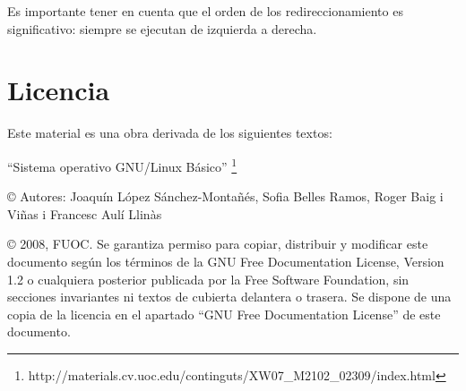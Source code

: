 \documentclass[12pt]{article}
\begin{document}
Es importante tener en cuenta que el orden de los redireccionamiento es 
significativo: siempre se ejecutan de izquierda a derecha.

\section{Licencia}

Este material es una obra derivada de los siguientes textos:

``Sistema operativo GNU/Linux Básico'' \footnote{http://materials.cv.uoc.edu/continguts/XW07\_M2102\_02309/index.html}

© Autores: Joaquín López Sánchez-Montañés, Sofia Belles Ramos, Roger Baig i Viñas i Francesc Aulí Llinàs

© 2008, FUOC. Se garantiza permiso para copiar, distribuir y modificar este documento según los
términos de la GNU Free Documentation License, Version 1.2 o cualquiera posterior publicada por la
Free Software Foundation, sin secciones invariantes ni textos de cubierta delantera o trasera. Se dispone
de una copia de la licencia en el apartado ``GNU Free Documentation License'' de este documento.
\end{document}
